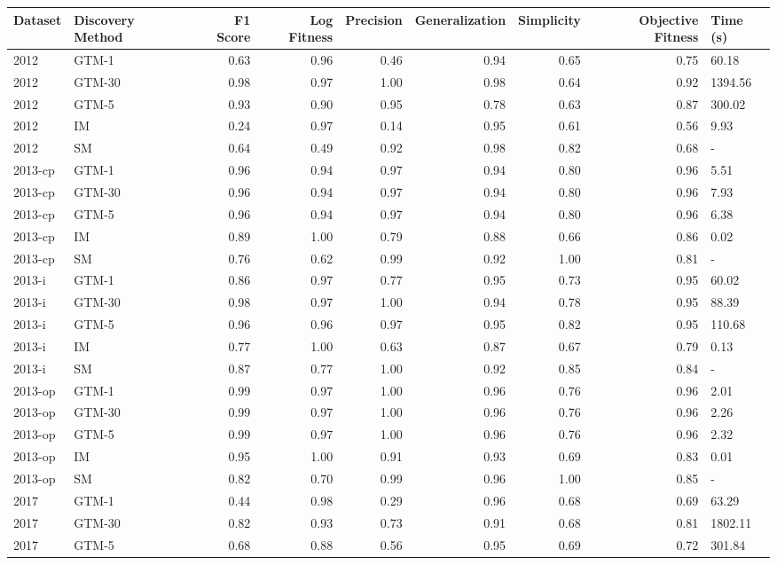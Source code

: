 \begin{tabular}{llrrrrrrl}
\toprule
Dataset & Discovery Method & F1 Score & Log Fitness & Precision & Generalization & Simplicity & Objective Fitness & Time (s) \\
\midrule
2012 & GTM-1 & 0.63 & 0.96 & 0.46 & 0.94 & 0.65 & 0.75 & 60.18 \\
2012 & GTM-30 & 0.98 & 0.97 & 1.00 & 0.98 & 0.64 & 0.92 & 1394.56 \\
2012 & GTM-5 & 0.93 & 0.90 & 0.95 & 0.78 & 0.63 & 0.87 & 300.02 \\
2012 & IM & 0.24 & 0.97 & 0.14 & 0.95 & 0.61 & 0.56 & 9.93 \\
2012 & SM & 0.64 & 0.49 & 0.92 & 0.98 & 0.82 & 0.68 & - \\
2013-cp & GTM-1 & 0.96 & 0.94 & 0.97 & 0.94 & 0.80 & 0.96 & 5.51 \\
2013-cp & GTM-30 & 0.96 & 0.94 & 0.97 & 0.94 & 0.80 & 0.96 & 7.93 \\
2013-cp & GTM-5 & 0.96 & 0.94 & 0.97 & 0.94 & 0.80 & 0.96 & 6.38 \\
2013-cp & IM & 0.89 & 1.00 & 0.79 & 0.88 & 0.66 & 0.86 & 0.02 \\
2013-cp & SM & 0.76 & 0.62 & 0.99 & 0.92 & 1.00 & 0.81 & - \\
2013-i & GTM-1 & 0.86 & 0.97 & 0.77 & 0.95 & 0.73 & 0.95 & 60.02 \\
2013-i & GTM-30 & 0.98 & 0.97 & 1.00 & 0.94 & 0.78 & 0.95 & 88.39 \\
2013-i & GTM-5 & 0.96 & 0.96 & 0.97 & 0.95 & 0.82 & 0.95 & 110.68 \\
2013-i & IM & 0.77 & 1.00 & 0.63 & 0.87 & 0.67 & 0.79 & 0.13 \\
2013-i & SM & 0.87 & 0.77 & 1.00 & 0.92 & 0.85 & 0.84 & - \\
2013-op & GTM-1 & 0.99 & 0.97 & 1.00 & 0.96 & 0.76 & 0.96 & 2.01 \\
2013-op & GTM-30 & 0.99 & 0.97 & 1.00 & 0.96 & 0.76 & 0.96 & 2.26 \\
2013-op & GTM-5 & 0.99 & 0.97 & 1.00 & 0.96 & 0.76 & 0.96 & 2.32 \\
2013-op & IM & 0.95 & 1.00 & 0.91 & 0.93 & 0.69 & 0.83 & 0.01 \\
2013-op & SM & 0.82 & 0.70 & 0.99 & 0.96 & 1.00 & 0.85 & - \\
2017 & GTM-1 & 0.44 & 0.98 & 0.29 & 0.96 & 0.68 & 0.69 & 63.29 \\
2017 & GTM-30 & 0.82 & 0.93 & 0.73 & 0.91 & 0.68 & 0.81 & 1802.11 \\
2017 & GTM-5 & 0.68 & 0.88 & 0.56 & 0.95 & 0.69 & 0.72 & 301.84 \\

\end{tabular}
